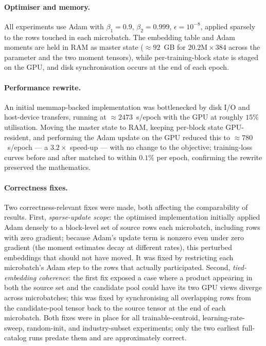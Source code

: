 \paragraph{Optimiser and memory.}
All experiments use Adam with $\beta_1=0.9$, $\beta_2=0.999$,
$\epsilon=10^{-8}$, applied sparsely to the rows touched in each microbatch. The
embedding table and Adam moments are held in RAM as master state
($\approx 92$~GB for $20.2\text{M}\times 384$ across the parameter and the two
moment tensors), while per-training-block state is staged on the GPU, and disk
synchronisation occurs at the end of each epoch.

\paragraph{Performance rewrite.}
An initial memmap-backed implementation was bottlenecked by disk I/O and
host-device transfers, running at $\approx 2473$~s/epoch with the GPU at roughly
$15\%$ utilisation. Moving the master state to RAM, keeping per-block state
GPU-resident, and performing the Adam update on the GPU reduced this to
$\approx 780$~s/epoch --- a $3.2\times$ speed-up --- with no change to the
objective; training-loss curves before and after matched to within $0.1\%$ per
epoch, confirming the rewrite preserved the mathematics.

\paragraph{Correctness fixes.}
Two correctness-relevant fixes were made, both affecting the comparability of
results. First, \emph{sparse-update scope}: the optimised implementation
initially applied Adam densely to a block-level set of source rows each
microbatch, including rows with zero gradient; because Adam's update term is
nonzero even under zero gradient (the moment estimates decay at different
rates), this perturbed embeddings that should not have moved. It was fixed by
restricting each microbatch's Adam step to the rows that actually participated.
Second, \emph{tied-embedding coherence}: the first fix exposed a case where a
product appearing in both the source set and the candidate pool could have its
two GPU views diverge across microbatches; this was fixed by synchronising all
overlapping rows from the candidate-pool tensor back to the source tensor at the
end of each microbatch. Both fixes were in place for all trainable-centroid,
learning-rate-sweep, random-init, and industry-subset experiments; only the two
earliest full-catalog runs predate them and are approximately correct.

